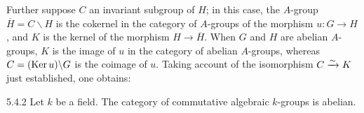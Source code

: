 Further suppose $C$ an invariant subgroup of $H$; in this case, the $A$-group $\overline H=C\backslash H$ is the cokernel in the category of $A$-groups of the morphism $u:G\to H$, and $K$ is the kernel of the morphism $H\to\overline H$. When $G$ and $H$ are abelian $A$-groups, $K$ is the image of $u$ in the category of abelian $A$-groups, whereas $C=(\operatorname{Ker} u)\backslash G$ is the coimage of $u$. Taking account of the isomorphism $C\xrightarrow{\sim} K$ just established, one obtains:
\begin{theorem}{5.4.2}\label{VIA.5.4.2}
Let $k$ be a field. The category of commutative algebraic $k$-groups is abelian.
\end{theorem}
